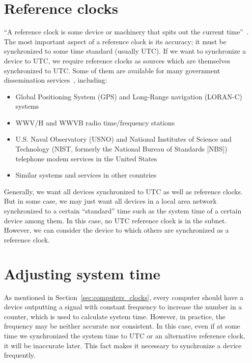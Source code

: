 \section{Reference clocks}%
\label{sec:reference_clocks}
``A reference clock is some device or machinery that spits out the current
time''~\cite{reference_clock}.
The most important aspect of a reference clock is its accuracy; it must be
synchronized to some time standard (usually UTC\null). If we want to
synchronize a device to UTC, we require reference clocks as sources which are
themselves synchronized to UTC\null. Some of them are
available for many government dissemination services~\cite{redbook}, including:
\begin{itemize}
    \item Global Positioning System (GPS) and Long-Range navigation (LORAN-C)
        systems
    \item WWV/H and WWVB radio time/frequency stations
    \item U.S. Naval Observatory (USNO) and National Institutes of Science and
        Technology (NIST\null, formerly the National Bureau of Standards [NBS])
        telephone modem services in the United States
    \item Similar systems and services in other countries
\end{itemize}
Generally, we want all devices synchronized to UTC as well as reference clocks.
But in some case, we may just want all devices in a local area network
synchronized to a certain ``standard'' time such as the system time of a
certain device among them. In this case, no UTC reference clock is in the
subnet. However, we can consider the device to which others are synchronized as
a reference clock. 

\section{Adjusting system time}%
\label{sec:adjusting_system_time}
As mentioned in Section~\ref{sec:computers_clocks}, every computer should have
a device outputting a signal with constant frequency to increase the number in
a counter, which is used to calculate system time. However, in practice, the
frequency may be neither accurate nor consistent. In this case, even if at some
time we synchronized the system time to UTC or an alternative reference clock,
it will be inaccurate later. This fact makes it necessary to synchronize a
device frequently.

